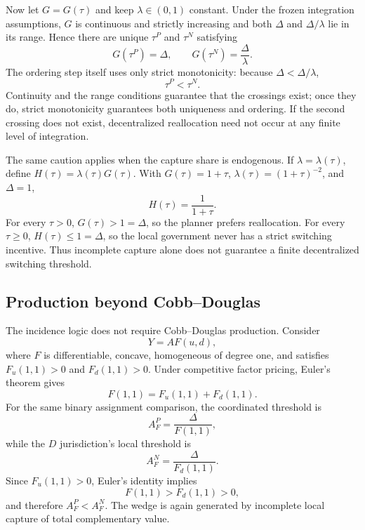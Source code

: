 Now let $G=G(\tau)$ and keep $\lambda\in(0,1)$ constant. Under the frozen integration assumptions, $G$ is continuous and strictly increasing and both $\Delta$ and $\Delta/\lambda$ lie in its range. Hence there are unique $\tau^P$ and $\tau^N$ satisfying
\begin{equation}
G(\tau^P)=\Delta,
\qquad
G(\tau^N)=\frac{\Delta}{\lambda}.
\end{equation}
The ordering step itself uses only strict monotonicity: because $\Delta<\Delta/\lambda$,
\[
\tau^P<\tau^N.
\]
Continuity and the range conditions guarantee that the crossings exist; once they do, strict monotonicity guarantees both uniqueness and ordering. If the second crossing does not exist, decentralized reallocation need not occur at any finite level of integration.

The same caution applies when the capture share is endogenous. If $\lambda=\lambda(\tau)$, define $H(\tau)=\lambda(\tau)G(\tau)$. With $G(\tau)=1+\tau$, $\lambda(\tau)=(1+\tau)^{-2}$, and $\Delta=1$,
\[
H(\tau)=\frac{1}{1+\tau}.
\]
For every $\tau>0$, $G(\tau)>1=\Delta$, so the planner prefers reallocation. For every $\tau\geq0$, $H(\tau)\leq1=\Delta$, so the local government never has a strict switching incentive. Thus incomplete capture alone does not guarantee a finite decentralized switching threshold.

\subsection{Production beyond Cobb--Douglas}

The incidence logic does not require Cobb--Douglas production. Consider
\begin{equation}
Y=A F(u,d),
\label{eq:general-production}
\end{equation}
where $F$ is differentiable, concave, homogeneous of degree one, and satisfies $F_u(1,1)>0$ and $F_d(1,1)>0$. Under competitive factor pricing, Euler's theorem gives
\begin{equation}
F(1,1)=F_u(1,1)+F_d(1,1).
\end{equation}
For the same binary assignment comparison, the coordinated threshold is
\begin{equation}
A^P_F=\frac{\Delta}{F(1,1)},
\end{equation}
while the $D$ jurisdiction's local threshold is
\begin{equation}
A^N_F=\frac{\Delta}{F_d(1,1)}.
\end{equation}
Since $F_u(1,1)>0$, Euler's identity implies
\[
F(1,1)>F_d(1,1)>0,
\]
and therefore $A^P_F<A^N_F$. The wedge is again generated by incomplete local capture of total complementary value.

